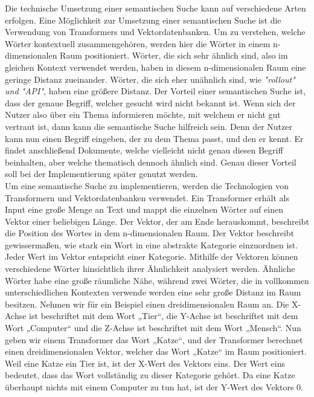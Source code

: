 Die technische Umsetzung einer semantischen Suche kann auf verschiedene Arten erfolgen.
Eine Möglichkeit zur Umsetzung einer semantischen Suche ist die Verwendung von Transformers und Vektordatenbanken.
Um zu verstehen, welche Wörter kontextuell zusammengehören, werden hier die Wörter in einem n-dimensionalen Raum positioniert.
Wörter, die sich sehr ähnlich sind, also im gleichen Kontext verwendet werden, haben in diesem n-dimensionalen Raum eine geringe Distanz zueinander.
Wörter, die sich eher unähnlich sind, wie \textit{"rollout" und "API"}, haben eine größere Distanz.
Der Vorteil einer semantischen Suche ist, dass der genaue Begriff, welcher gesucht wird nicht bekannt ist.
Wenn sich der Nutzer also über ein Thema informieren möchte, mit welchem er nicht gut vertraut ist, dann kann die semantische Suche hilfreich sein.
Denn der Nutzer kann nun einen Begriff eingeben, der zu dem Thema passt, und den er kennt.
Er findet anschließend Dokumente, welche vielleicht nicht genau diesen Begriff beinhalten, aber welche thematisch dennoch ähnlich sind.
Genau dieser Vorteil soll bei der Implementierung später genutzt werden.\\

Um eine semantische Suche zu implementieren, werden die Technologien von Transformern und Vektordatenbanken verwendet.
Ein Transformer erhält als Input eine große Menge an Text und mappt die einzelnen Wörter auf einen Vektor einer beliebigen Länge.
Der Vektor, der am Ende herauskommt, beschreibt die Position des Wortes in dem n-dimensionalen Raum.
Der Vektor beschreibt gewissermaßen, wie stark ein Wort in eine abstrakte Kategorie einzuordnen ist.
Jeder Wert im Vektor entspricht einer Kategorie.
Mithilfe der Vektoren können verschiedene Wörter hinsichtlich ihrer Ähnlichkeit analysiert werden.
Ähnliche Wörter habe eine große räumliche Nähe, während zwei Wörter, die in vollkommen unterschiedlichen Kontexten verwende werden eine sehr große Distanz im Raum besitzen.
Nehmen wir für ein Beispiel einen dreidimensionalen Raum an.
Die X-Achse ist beschriftet mit dem Wort „Tier“, die Y-Achse ist beschriftet mit dem Wort „Computer“ und die Z-Achse ist beschriftet mit dem Wort „Mensch“.
Nun geben wir einem Transformer das Wort „Katze“, und der Transformer berechnet einen dreidimensionalen Vektor, welcher das Wort „Katze“ im Raum positioniert.
Weil eine Katze ein Tier ist, ist der X-Wert des Vektors eins.
Der Wert eins bedeutet, dass das Wort vollständig zu dieser Kategorie gehört.
Da eine Katze überhaupt nichts mit einem Computer zu tun hat, ist der Y-Wert des Vektors 0.\\

